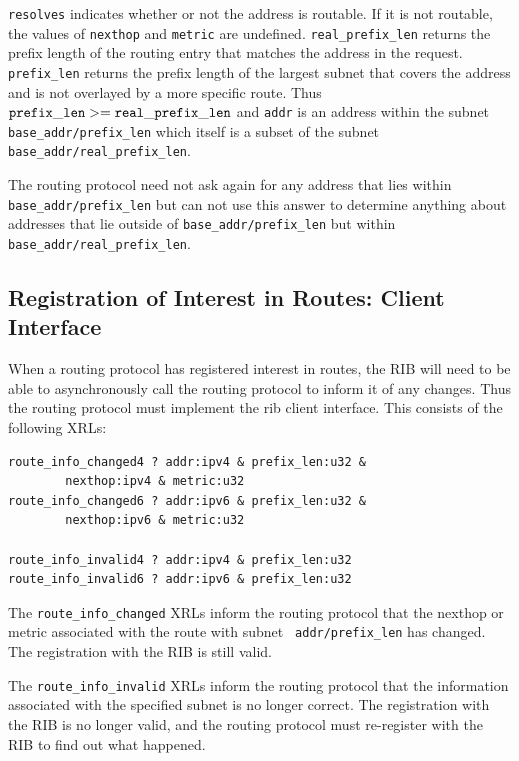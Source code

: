 \documentclass[11pt]{article}
\begin{document}
{\tt resolves} indicates whether or not the address is routable.  If
it is not routable, the values of {\tt nexthop} and {\tt metric} are
undefined.  {\tt real\_prefix\_len} returns the prefix length of the routing
entry that matches the address in the request.  {\tt prefix\_len} returns
the prefix length of the largest subnet that covers the address and is
not overlayed by a more specific route.  Thus ${\tt prefix\_len} >= {\tt
real\_prefix\_len}$ and {\tt addr} is an address within the subnet {\tt
base\_addr/prefix\_len} which itself is a subset of the subnet {\tt
base\_addr/real\_prefix\_len}.  

The routing protocol need not ask again for any address that lies
within {\tt base\_addr/prefix\_len} but can not use this answer to determine
anything about addresses that lie outside of {\tt base\_addr/prefix\_len}
but within {\tt base\_addr/real\_prefix\_len}.

\subsection{Registration of Interest in Routes: Client Interface}
When a routing protocol has registered interest in routes, the RIB
will need to be able to asynchronously call the routing protocol to
inform it of any changes.  Thus the routing protocol must implement
the rib client interface.  This consists of the following XRLs:
\begin{verbatim}
route_info_changed4 ? addr:ipv4 & prefix_len:u32 & 
        nexthop:ipv4 & metric:u32
route_info_changed6 ? addr:ipv6 & prefix_len:u32 & 
        nexthop:ipv6 & metric:u32

route_info_invalid4 ? addr:ipv4 & prefix_len:u32
route_info_invalid6 ? addr:ipv6 & prefix_len:u32
\end{verbatim}
The {\tt route\_info\_changed} XRLs inform the routing protocol that the
nexthop or metric associated with the route with subnet {\tt
addr/prefix\_len} has changed.  The registration with the RIB is still
valid.

The {\tt route\_info\_invalid} XRLs inform the routing protocol that the
information associated with the specified subnet is no longer correct.
The registration with the RIB is no longer valid, and the routing
protocol must re-register with the RIB to find out what happened.

\appendix
\end{document}
